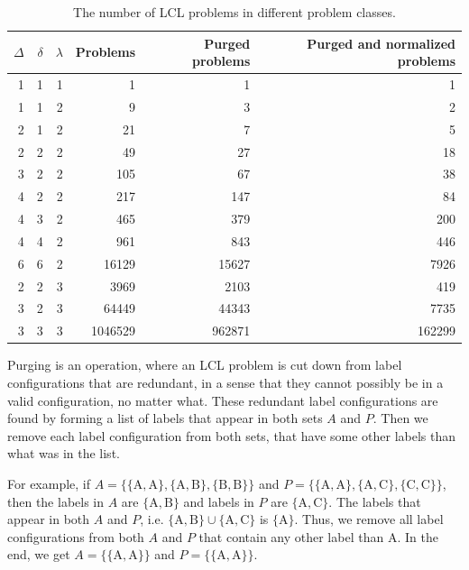\begin{table}[H]
  \centering
  \begin{tabular}{rrrrrr}
    \toprule
    $\Delta$ & $\delta$ & $\lambda$ & Problems & Purged problems & Purged and normalized problems\\
    \midrule
    1 & 1 & 1 & 1 & 1 & 1 \\
    \midrule
    1 & 1 & 2 & 9 & 3 & 2 \\
    2 & 1 & 2 & 21 & 7 & 5 \\
    2 & 2 & 2 & 49 & 27 & 18 \\
    3 & 2 & 2 & 105 & 67 & 38 \\
    4 & 2 & 2 & 217 & 147 & 84 \\
    4 & 3 & 2 & 465 & 379 & 200 \\
    4 & 4 & 2 & 961 & 843 & 446 \\
    6 & 6 & 2 & 16129 & 15627 & 7926 \\
    \midrule
    2 & 2 & 3 & 3969 & 2103 & 419 \\
    3 & 2 & 3 & 64449 & 44343 & 7735 \\
    3 & 3 & 3 & 1046529 & 962871 & 162299 \\
    \bottomrule
  \end{tabular}
  \caption{%
    The number of LCL problems in different problem classes.
  }
  \label{tbl:lcl_problem_classes}
\end{table}

Purging is an operation, where an LCL problem is cut down from label configurations that are redundant, in a sense that they cannot possibly be in a valid configuration, no matter what.
These redundant label configurations are found by forming a list of labels that appear in both sets $A$ and $P$.
Then we remove each label configuration from both sets, that have some other labels than what was in the list.

For example, if $A=\{\{\mathrm{A, A}\}, \{\mathrm{A, B}\}, \{\mathrm{B, B}\}\}$ and $P=\{\{\mathrm{A, A}\}, \{\mathrm{A, C}\}, \{\mathrm{C, C}\}\}$, then the labels in $A$ are $\{\mathrm{A, B}\}$ and labels in $P$ are $\{\mathrm{A, C}\}$.
The labels that appear in both $A$ and $P$, i.e.  $\{\mathrm{A, B}\} \cup \{\mathrm{A, C}\} $ is $\{\mathrm{A}\}$.
Thus, we remove all label configurations from both $A$ and $P$ that contain any other label than $\mathrm{A}$.
In the end, we get $A=\{\{\mathrm{A, A}\}\}$ and $P=\{\{\mathrm{A, A}\}\}$.


